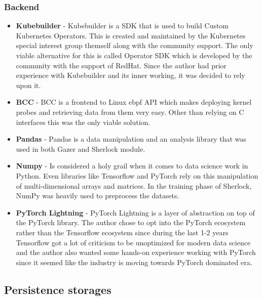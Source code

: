 \subsubsection{Backend}
\begin{itemize}
    \item \textbf{Kubebuilder} - Kubebuilder is a SDK that is used to build Custom Kubernetes Operators. This is created and maintained by the Kubernetes special interest group themself along with the community support. The only viable alternative for this is called Operator SDK which is developed by the community with the support of RedHat. Since the author had prior experience with Kubebuilder and its inner working, it was decided to rely upon it.
    \item \textbf{BCC} - BCC is a frontend to Linux \ac{ebpf} API which makes deploying kernel probes and retrieving data from them very easy. Other than relying on C interfaces this was the only viable solution. 
    \item \textbf{Pandas} - Pandas is a data manipulation and an analysis library that was used in both Gazer and Sherlock module.
    \item \textbf{Numpy} - Is considered a holy grail when it comes to data science work in Python. Even libraries like Tensorflow and PyTorch rely on this manipulation of multi-dimensional arrays and matrices. In the training phase of Sherlock, NumPy was heavily used to preprocess the datasets.
    \item \textbf{PyTorch Lightning} - PyTorch Lightning is a layer of abstraction on top of the PyTorch library. The author chose to opt into the PyTorch ecosystem rather than the Tensorflow ecosystem since during the last 1-2 years Tensorflow got a lot of criticism to be unoptimized for modern data science and the author also wanted some hands-on experience working with PyTorch since it seemed like the industry is moving towards PyTorch dominated era.
\end{itemize}

\subsection{Persistence storages}

